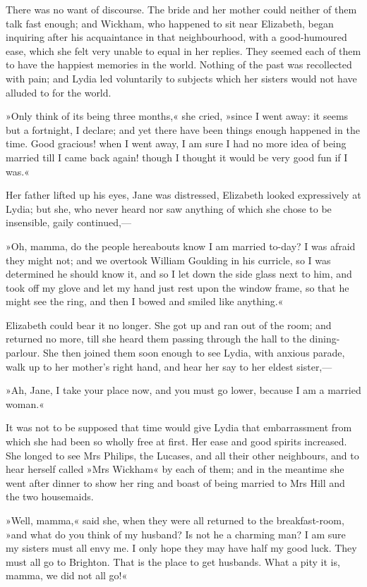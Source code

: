 There was no want of discourse. The bride and her mother could neither of them talk fast enough; and Wickham, who happened to sit near Elizabeth, began inquiring after his acquaintance in that neighbourhood, with a good-humoured ease, which she felt very unable to equal in her replies. They seemed each of them to have the happiest memories in the world. Nothing of the past was recollected with pain; and Lydia led voluntarily to subjects which her sisters would not have alluded to for the world.

»Only think of its being three months,« she cried, »since I went away: it seems but a fortnight, I declare; and yet there have been things enough happened in the time. Good gracious! when I went away, I am sure I had no more idea of being married till I came back again! though I thought it would be very good fun if I was.«

Her father lifted up his eyes, Jane was distressed, Elizabeth looked expressively at Lydia; but she, who never heard nor saw anything of which she chose to be insensible, gaily continued,—

»Oh, mamma, do the people hereabouts know I am married to-day? I was afraid they might not; and we overtook William Goulding in his curricle, so I was determined he should know it, and so I let down the side glass next to him, and took off my glove and let my hand just rest upon the window frame, so that he might see the ring, and then I bowed and smiled like anything.«

Elizabeth could bear it no longer. She got up and ran out of the room; and returned no more, till she heard them passing through the hall to the dining-parlour. She then joined them soon enough to see Lydia, with anxious parade, walk up to her mother's right hand, and hear her say to her eldest sister,—

»Ah, Jane, I take your place now, and you must go lower, because I am a married woman.«

It was not to be supposed that time would give Lydia that embarrassment from which she had been so wholly free at first. Her ease and good spirits increased. She longed to see Mrs Philips, the Lucases, and all their other neighbours, and to hear herself called »Mrs Wickham« by each of them; and in the meantime she went after dinner to show her ring and boast of being married to Mrs Hill and the two housemaids.

»Well, mamma,« said she, when they were all returned to the breakfast-room, »and what do you think of my husband? Is not he a charming man? I am sure my sisters must all envy me. I only hope they may have half my good luck. They must all go to Brighton. That is the place to get husbands. What a pity it is, mamma, we did not all go!«

